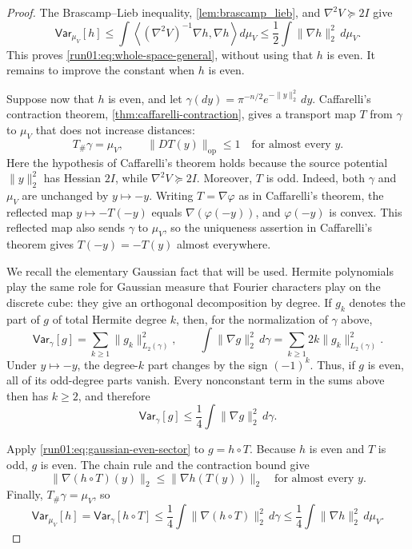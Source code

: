 \documentclass[11pt]{article}
\numberwithin{equation}{section}
\theoremstyle{definition}
\newcommand{\V}[2]{\mathsf{Var}_{#1}\left[#2\right]}
\begin{document}
\begin{proof}
The Brascamp--Lieb inequality, \cref{lem:brascamp_lieb}, and
$\nabla^2V\succeq2I$ give
\[
\V{\mu_V}{h}
\leq \int \left\langle(\nabla^2V)^{-1}\nabla h,\nabla h\right\rangle d\mu_V
\leq\frac12\int\|\nabla h\|_2^2\,d\mu_V.
\]
This proves \cref{run01:eq:whole-space-general}, without using that $h$ is even.
It remains to improve the constant when $h$ is even.

Suppose now that $h$ is even, and let
$\gamma(dy)=\pi^{-n/2}e^{-\|y\|_2^2}\,dy$.
Caffarelli's contraction theorem, \cref{thm:caffarelli-contraction}, gives a
transport map $T$ from
$\gamma$ to
$\mu_V$ that does not increase distances:
\[
T_\#\gamma=\mu_V,
\qquad
\|DT(y)\|_{\mathrm{op}}\leq1
\quad
\text{for almost every $y$}.
\]
Here the hypothesis of Caffarelli's theorem holds because the source potential
$\|y\|_2^2$ has Hessian
$2I$, while
$\nabla^2V\succeq2I$.
Moreover, $T$ is odd.
Indeed, both $\gamma$ and
$\mu_V$ are unchanged by
$y\mapsto-y$.
Writing $T=\nabla\varphi$ as in Caffarelli's theorem, the reflected map
$y\mapsto-T(-y)$ equals
$\nabla(\varphi(-y))$, and
$\varphi(-y)$ is convex.
This reflected map also sends $\gamma$ to
$\mu_V$, so the uniqueness assertion in Caffarelli's theorem gives
$T(-y)=-T(y)$ almost everywhere.

We recall the elementary Gaussian fact that will be used.
Hermite polynomials play the same role for Gaussian measure that Fourier
characters play on the discrete cube: they give an orthogonal decomposition by
degree.
If $g_k$ denotes the part of
$g$ of total Hermite degree
$k$, then, for the normalization of
$\gamma$ above,
\[
\V{\gamma}{g}=\sum_{k\geq1}\|g_k\|_{L_2(\gamma)}^2,
\qquad
\int\|\nabla g\|_2^2\,d\gamma =\sum_{k\geq1}2k\|g_k\|_{L_2(\gamma)}^2.
\]
Under $y\mapsto-y$, the
degree-$k$ part changes by the sign
$(-1)^k$.
Thus, if $g$ is even, all of its odd-degree parts vanish.
Every nonconstant term in the sums above then has $k\geq2$, and therefore
\begin{equation}
 \V{\gamma}{g}
 \leq\frac14\int\|\nabla g\|_2^2\,d\gamma.
 \label{run01:eq:gaussian-even-sector}
\end{equation}

Apply \cref{run01:eq:gaussian-even-sector} to $g=h\circ T$.
Because $h$ is even and
$T$ is odd,
$g$ is even.
The chain rule and the contraction bound give
\[
 \|\nabla(h\circ T)(y)\|_2
 \leq\|\nabla h(T(y))\|_2
 \quad\text{for almost every $y$}.
\]
Finally, $T_\#\gamma=\mu_V$, so
\[
\V{\mu_V}{h}
=\V{\gamma}{h\circ T}
\leq\frac14\int\|\nabla(h\circ T)\|_2^2\,d\gamma
\leq\frac14\int\|\nabla h\|_2^2\,d\mu_V.
\]
\end{proof}
\end{document}
